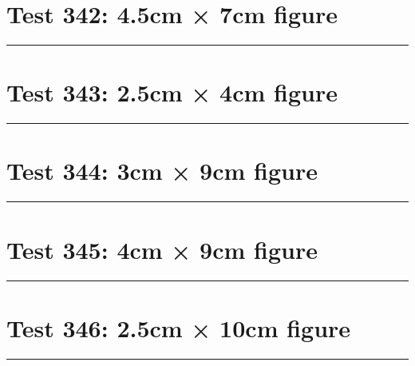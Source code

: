 \documentclass[a4paper,11pt]{article}
\begin{document}
\section*{Test 342: 4.5cm × 7cm figure}
\begin{swarmwrap}%
  \begin{minipage}[t]{4cm}
    \centering
    \rule{\linewidth}{7cm}
  \end{minipage}%
\end{swarmwrap}%
\swarmwrapnext
\lipsum[15]
\lipsum[16]
\lipsum[17]
\section*{Test 343: 2.5cm × 4cm figure}
\begin{swarmwrap}%
  \begin{minipage}[t]{2cm}
    \centering
    \rule{\linewidth}{4cm}
  \end{minipage}%
\end{swarmwrap}%
\swarmwrapnext
\lipsum[22]
\lipsum[23]
\lipsum[24]
\section*{Test 344: 3cm × 9cm figure}
\begin{swarmwrap}%
  \begin{minipage}[t]{3cm}
    \centering
    \rule{\linewidth}{9cm}
  \end{minipage}%
\end{swarmwrap}%
\swarmwrapnext
\lipsum[126]
\lipsum[127]
\lipsum[128]
\lipsum[129]
\lipsum[130]
\lipsum[131]
\section*{Test 345: 4cm × 9cm figure}
\begin{swarmwrap}%
  \begin{minipage}[t]{4cm}
    \centering
    \rule{\linewidth}{9cm}
  \end{minipage}%
\end{swarmwrap}%
\swarmwrapnext
\lipsum[71]
\lipsum[72]
\lipsum[73]
\lipsum[74]
\lipsum[75]
\lipsum[76]
\section*{Test 346: 2.5cm × 10cm figure}
\begin{swarmwrap}%
  \begin{minipage}[t]{2cm}
    \centering
    \rule{\linewidth}{10cm}
  \end{minipage}%
\end{swarmwrap}%
\swarmwrapnext
\lipsum[90]
\lipsum[91]
\lipsum[92]
\end{document}
